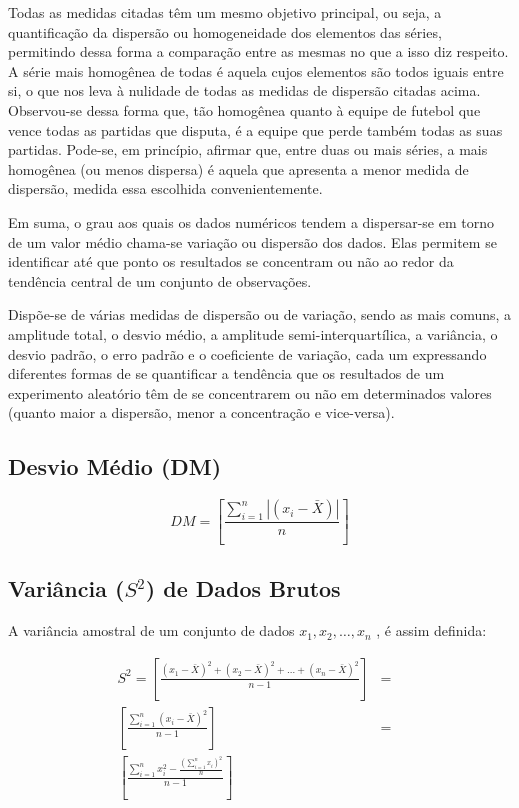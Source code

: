 Todas as medidas citadas têm um mesmo objetivo principal, ou seja, a quantificação da dispersão ou homogeneidade dos elementos das séries, permitindo dessa forma a comparação entre as mesmas no que a isso diz respeito. A série mais homogênea de todas é aquela cujos elementos são todos iguais entre si, o que nos leva à nulidade de todas as medidas de dispersão citadas acima. Observou-se dessa forma que, tão homogênea quanto à equipe de futebol que vence todas as partidas que disputa, é a equipe que perde também todas as suas partidas. Pode-se, em princípio, afirmar que, entre duas ou mais séries, a mais homogênea (ou menos dispersa) é aquela que apresenta a menor medida de dispersão, medida essa escolhida convenientemente.\vskip0.3cm

Em suma, o grau aos quais os dados numéricos tendem a dispersar-se em torno de um valor médio chama-se variação ou dispersão dos dados. Elas permitem se identificar até que ponto os resultados se concentram ou não ao redor da tendência central de um conjunto de observações.\vskip0.3cm


\newpage
Dispõe-se de várias medidas de dispersão ou de variação, sendo as mais comuns, a amplitude total, o desvio médio, a amplitude semi-interquartílica, a variância, o desvio padrão, o erro padrão e o coeficiente de variação, cada um expressando diferentes formas de se quantificar a tendência que os resultados de um experimento aleatório têm de se concentrarem ou não em determinados valores (quanto maior a dispersão, menor a concentração e vice-versa).


\subsection{Desvio Médio (DM)}

\begin{equation}\label{dn}
    DM= \left[  \frac{\sum_{i=1}^{n}|(x_{i}-\bar{X})|}{n} \right]
\end{equation}



\subsection{Variância ($S^{2}$) de Dados Brutos}

A variância amostral de um conjunto de dados $x_{1},x_{2},\ldots,x_{n}$ , é assim definida:

\begin{eqnarray}\nonumber
S^{2} = \left[ \frac{(x_{1}-\bar{X})^{2}+(x_{2}-\bar{X})^{2}+\ldots+(x_{n}-\bar{X})^{2}}{n-1} \right]
    & = &  \\
    \left[ \frac{\sum_{i=1}^{n}(x_{i}-\bar{X})^{2}}{n-1} \right]  & = &  \\ \nonumber
    \left[ \frac{\sum_{i=1}^{n}x_{i}^{2}-\frac{(\sum_{i=1}^{n}x_{i})^{2}}{n}}{n-1} \right] &  &
\end{eqnarray}


